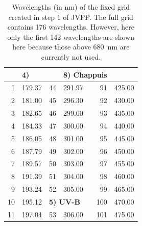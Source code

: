 \documentclass[a4paper,twoside]{article}
\renewcommand{\arraystretch}{1}
\newcommand{\bottomhline}{\noalign{\vspace{1mm}}\hline}
\begin{document}
\begin{table}[tbh]
  \begin{center}
    \renewcommand{\arraystretch}{1.05}
    \caption{Wavelengths (in nm) of the fixed grid created in step 1 of
      JVPP. The full grid contains 176 wavelengths. However, here only
      the first 142 wavelengths are shown here because those above
      680~nm are currently not used.}
    \label{tab:wave176}
    \small
    \begin{tabular}{|rp{}|rp{}|rp{}|}
      \bottomhline
      \multicolumn{2}{|l|}{\bf 1) Schumann-Runge} & \multicolumn{2}{|l|}{\bf 4)}      & \multicolumn{2}{|l|}{\bf 8) Chappuis} \\\hline
        1 & 179.37                                &  44 & 291.97                      &  91 & 425.00                          \\
        2 & 181.00                                &  45 & 296.30                      &  92 & 430.00                          \\
        3 & 182.65                                &  46 & 299.00                      &  93 & 435.00                          \\
        4 & 184.33                                &  47 & 300.00                      &  94 & 440.00                          \\
        5 & 186.05                                &  48 & 301.00                      &  95 & 445.00                          \\
        6 & 187.79                                &  49 & 302.00                      &  96 & 450.00                          \\
        7 & 189.57                                &  50 & 303.00                      &  97 & 455.00                          \\
        8 & 191.39                                &  51 & 304.00                      &  98 & 460.00                          \\
        9 & 193.24                                &  52 & 305.00                      &  99 & 465.00                          \\\cline{3-4}
       10 & 195.12                                & \multicolumn{2}{|l|}{\bf 5) UV-B} & 100 & 470.00                          \\\cline{3-4}
       11 & 197.04                                &  53 & 306.00                      & 101 & 475.00                          \\

\end{tabular}
\end{center}
\end{table}
\end{document}
